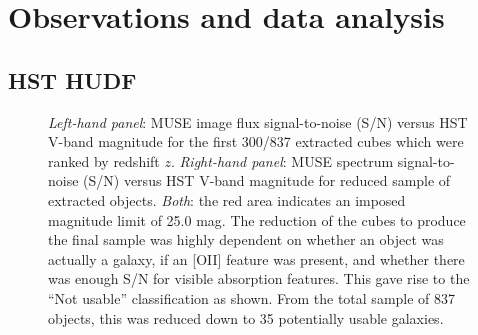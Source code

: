 \documentclass[12pt, twocolumn]{revtex4-1}    %
\begin{document}
\section{Observations and data analysis}

\subsection{HST HUDF}

\begin{figure}
  \captionsetup{justification=raggedright}
  \caption[HUDF Objects]{\textit{Left-hand panel}: MUSE image flux signal-to-noise (S/N) versus HST V-band magnitude for the first 300/837 extracted cubes which were ranked by redshift $z$. \textit{Right-hand panel}: MUSE spectrum signal-to-noise (S/N) versus HST V-band magnitude for reduced sample of extracted objects. \textit{Both}: the red area indicates an imposed magnitude limit of 25.0 mag. The reduction of the cubes to produce the final sample was highly dependent on whether an object was actually a galaxy, if an [OII] feature was present, and whether there was enough S/N for visible absorption features. This gave rise to the ``Not usable'' classification as shown. From the total sample of 837 objects, this was reduced down to 35 potentially usable galaxies.}
\label{fig:sn_vband}
\end{figure}
\end{document}
